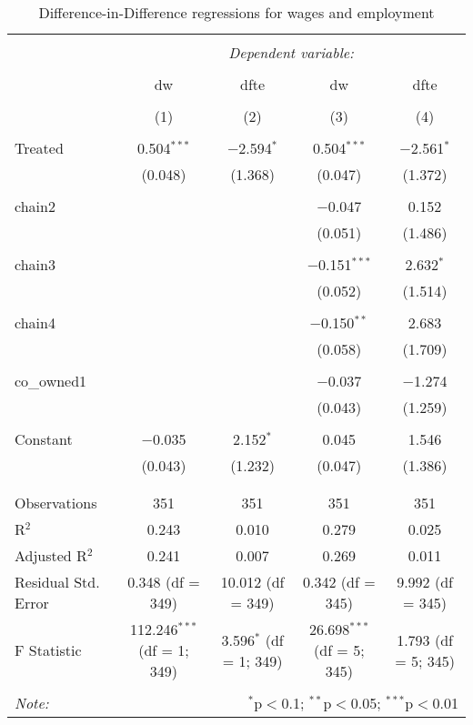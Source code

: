 
\begin{table}[!htbp] \centering 
  \caption{Difference-in-Difference regressions for wages and employment} 
  \label{Tab:DiD} 
\begin{tabular}{@{\extracolsep{5pt}}lcccc} 
\\[-1.8ex]\hline 
\hline \\[-1.8ex] 
 & \multicolumn{4}{c}{\textit{Dependent variable:}} \\ 
\cline{2-5} 
\\[-1.8ex] & dw & dfte & dw & dfte \\ 
\\[-1.8ex] & (1) & (2) & (3) & (4)\\ 
\hline \\[-1.8ex] 
 Treated & 0.504$^{***}$ & $-$2.594$^{*}$ & 0.504$^{***}$ & $-$2.561$^{*}$ \\ 
  & (0.048) & (1.368) & (0.047) & (1.372) \\ 
  & & & & \\ 
 chain2 &  &  & $-$0.047 & 0.152 \\ 
  &  &  & (0.051) & (1.486) \\ 
  & & & & \\ 
 chain3 &  &  & $-$0.151$^{***}$ & 2.632$^{*}$ \\ 
  &  &  & (0.052) & (1.514) \\ 
  & & & & \\ 
 chain4 &  &  & $-$0.150$^{**}$ & 2.683 \\ 
  &  &  & (0.058) & (1.709) \\ 
  & & & & \\ 
 co\_owned1 &  &  & $-$0.037 & $-$1.274 \\ 
  &  &  & (0.043) & (1.259) \\ 
  & & & & \\ 
 Constant & $-$0.035 & 2.152$^{*}$ & 0.045 & 1.546 \\ 
  & (0.043) & (1.232) & (0.047) & (1.386) \\ 
  & & & & \\ 
\hline \\[-1.8ex] 
Observations & 351 & 351 & 351 & 351 \\ 
R$^{2}$ & 0.243 & 0.010 & 0.279 & 0.025 \\ 
Adjusted R$^{2}$ & 0.241 & 0.007 & 0.269 & 0.011 \\ 
Residual Std. Error & 0.348 (df = 349) & 10.012 (df = 349) & 0.342 (df = 345) & 9.992 (df = 345) \\ 
F Statistic & 112.246$^{***}$ (df = 1; 349) & 3.596$^{*}$ (df = 1; 349) & 26.698$^{***}$ (df = 5; 345) & 1.793 (df = 5; 345) \\ 
\hline 
\hline \\[-1.8ex] 
\textit{Note:}  & \multicolumn{4}{r}{$^{*}$p$<$0.1; $^{**}$p$<$0.05; $^{***}$p$<$0.01} \\ 
\end{tabular} 
\end{table} 
